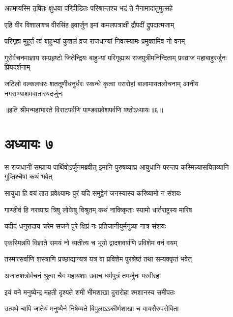 \twolineshloka
{अहमप्यस्मि तृषितः क्षुधया परिपीडितः}
{परिश्रान्तश्च भद्रं ते नैनामादातुमुत्सहे}




\twolineshloka
{एहि वीर विशालाश्च वीरसिंह इवार्जुन}
{इमां कमलपत्राक्षीं द्रौपदीं द्रुपदात्मजाम्}


\twolineshloka
{परिगृह्य मुहूर्तं त्वं बाहुभ्यां कुशलं व्रज}
{राजधान्यां निवत्स्यामः प्रमुक्तमिव नो वनम्}



\threelineshloka
{गुरोर्वचनमाज्ञाय सम्प्रहृष्टो जितेन्द्रियः}
{बाहुभ्यां परिगृह्याथ राजपुत्रीमनिन्दिताम्}
{प्रवव्राज महाबाहुरर्जुनः प्रियदर्शनाम्}


\threelineshloka
{जटिलो वल्कलधरः शततूणीधनुर्धरः}
{स्कन्धे कृत्वा वरारोहां बालामायतलोचनाम्}
{आनीय नगराभ्याशमवातारयदर्जुनः}


॥इति श्रीमन्महाभारते विराटपर्वणि पाण्डवप्रवेशपर्वणि षष्ठोऽध्यायः॥६॥

\chapter{अध्यायः ७}

\threelineshloka
{स राजधानीं सम्प्राप्य पार्थिवोऽर्जुनमब्रवीत्}
{इमानि पुरुषव्याघ्र आयुधानि परन्तप}
{कस्मिन्न्यासयितव्यानि गुप्तिश्चैषां कथं भवेत्}


\twolineshloka
{सायुधा हि वयं तात प्रवेक्ष्यामः पुरं यदि}
{समुद्वेगं जनस्यास्य करिष्यामो न संशयः}


\twolineshloka
{गाण्डीवं हि नरव्याघ्र त्रिषु लोकेषु विश्रुतम्}
{कथं नाविष्कृताः स्यामो धार्तराष्ट्रस्य मारिष}


\twolineshloka
{यदीदं धनुरादाय चरेम सजने पुरे}
{क्षिप्रं नः प्रतिजानीयुर्मनुष्या नात्र संशयः}


\twolineshloka
{एकस्मिन्नपि विज्ञाते समयं नो व्यतीत्य च}
{भूयो द्वादशवर्षाणि प्रविशेम वनं वयम्}


\twolineshloka
{तस्मात्सर्वाणि शस्त्राणि प्रच्छाद्यान्यत्र यत्र वा}
{प्रविशेम पुरश्रेष्ठं तथा सम्यक्कृतं भवेत्}



\twolineshloka
{अजातशत्रोर्वचनं श्रुत्वा चैव महायशाः}
{उवाच धर्मपुत्रं तमर्जुनः परवीरहा}


\twolineshloka
{इयं वने मनुष्येन्द्र महती दृश्यते शमी}
{भीमशाखा दुरारोहा श्मशानस्य समीपतः}


\twolineshloka
{उत्पथे चापि जातेयं मनुष्यैर्न निषेव्यते}
{विपुलाऽऽकीर्णशाखा च वायसैरुपसेविता}


